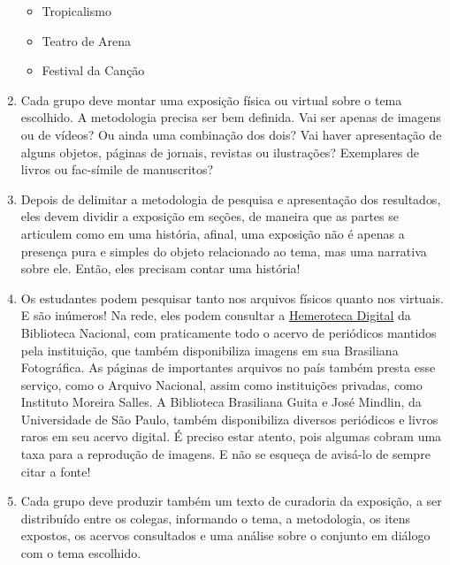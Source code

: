 \documentclass[12pt]{extarticle}
\begin{document}
\begin{enumerate}
\begin{itemize}
  
\item
  Tropicalismo
\item
  Teatro de Arena
  
  
\item
  Festival da Canção
  
   

\end{itemize}


 


\item Cada grupo deve montar uma exposição física ou virtual sobre o tema
escolhido. A metodologia precisa ser bem definida. Vai ser apenas de
imagens ou de vídeos? Ou ainda uma combinação dos dois? Vai haver
apresentação de alguns objetos, páginas de jornais, revistas ou
ilustrações? Exemplares de livros ou fac-símile de manuscritos?

\item Depois de delimitar a metodologia de pesquisa e apresentação dos
resultados, eles devem dividir a exposição em seções, de maneira que as
partes se articulem como em uma história, afinal, uma exposição não é
apenas a presença pura e simples do objeto relacionado ao tema, mas uma
narrativa sobre ele. Então, eles precisam contar uma história!

\item Os estudantes podem pesquisar tanto nos arquivos físicos quanto nos
virtuais. E são inúmeros! Na rede, eles podem consultar a \href{https://bndigital.bn.gov.br/hemeroteca-digital/}{Hemeroteca
Digital} da Biblioteca Nacional, com praticamente todo o acervo de
periódicos mantidos pela instituição, que também disponibiliza imagens
em sua Brasiliana Fotográfica. As páginas de importantes arquivos no
país também presta esse serviço, como o Arquivo Nacional, assim como
instituições privadas, como Instituto Moreira Salles. A Biblioteca
Brasiliana Guita e José Mindlin, da Universidade de São Paulo, também
disponibiliza diversos periódicos e livros raros em seu acervo digital.
É preciso estar atento, pois algumas cobram uma taxa para a reprodução
de imagens. E não se esqueça de avisá-lo de sempre citar a fonte!

\item Cada grupo deve produzir também um texto de curadoria da exposição, a
ser distribuído entre os colegas, informando o tema, a metodologia, os
itens expostos, os acervos consultados e uma análise sobre o conjunto em
diálogo com o tema escolhido.
\end{enumerate}
\end{document}
